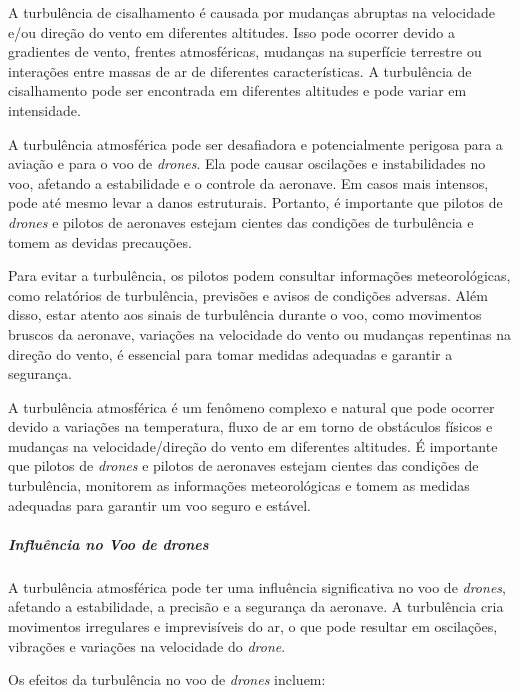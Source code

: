 \documentclass[a4paper, 12pt, onecolumn,singlespacing]{article}
\begin{document}
	A turbulência de cisalhamento é causada por mudanças abruptas na velocidade e/ou direção do vento em diferentes altitudes. Isso pode ocorrer devido a gradientes de vento, frentes atmosféricas, mudanças na superfície terrestre ou interações entre massas de ar de diferentes características. A turbulência de cisalhamento pode ser encontrada em diferentes altitudes e pode variar em intensidade.
	
	A turbulência atmosférica pode ser desafiadora e potencialmente perigosa para a aviação e para o voo de \textit{drones}. Ela pode causar oscilações e instabilidades no voo, afetando a estabilidade e o controle da aeronave. Em casos mais intensos, pode até mesmo levar a danos estruturais. Portanto, é importante que pilotos de \textit{drones} e pilotos de aeronaves estejam cientes das condições de turbulência e tomem as devidas precauções.
	
	Para evitar a turbulência, os pilotos podem consultar informações meteorológicas, como relatórios de turbulência, previsões e avisos de condições adversas. Além disso, estar atento aos sinais de turbulência durante o voo, como movimentos bruscos da aeronave, variações na velocidade do vento ou mudanças repentinas na direção do vento, é essencial para tomar medidas adequadas e garantir a segurança.
	
	A turbulência atmosférica é um fenômeno complexo e natural que pode ocorrer devido a variações na temperatura, fluxo de ar em torno de obstáculos físicos e mudanças na velocidade/direção do vento em diferentes altitudes. É importante que pilotos de \textit{drones} e pilotos de aeronaves estejam cientes das condições de turbulência, monitorem as informações meteorológicas e tomem as medidas adequadas para garantir um voo seguro e estável.
	
	\subparagraph{Influência no Voo de \textit{drones}}
	A turbulência atmosférica pode ter uma influência significativa no voo de \textit{drones}, afetando a estabilidade, a precisão e a segurança da aeronave. A turbulência cria movimentos irregulares e imprevisíveis do ar, o que pode resultar em oscilações, vibrações e variações na velocidade do \textit{drone}.
	
	Os efeitos da turbulência no voo de \textit{drones} incluem:
	
\end{document}
